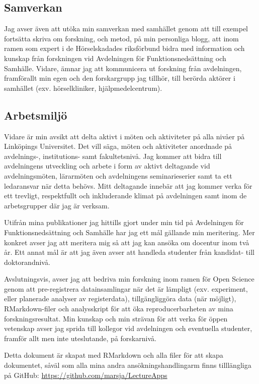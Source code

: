\documentclass[]{article}
\begin{document}
\hypertarget{samverkan}{%
\subsection{Samverkan}\label{samverkan}}

Jag avser även att utöka min samverkan med samhället genom att till
exempel fortsätta skriva om forskning, och metod, på min personliga
blogg, att inom ramen som expert i de Hörselskadades riksförbund bidra
med information och kunskap från forskningen vid Avdelningen för
Funktionsnedsättning och Samhälle. Vidare, ämnar jag att kommunicera ut
forskning från avdelningen, framförallt min egen och den forskargrupp
jag tillhör, till berörda aktörer i samhället (exv. hörselkliniker,
hjälpmedelcentrum).

\hypertarget{arbetsmiljuxf6}{%
\subsection{Arbetsmiljö}\label{arbetsmiljuxf6}}

Vidare är min avsikt att delta aktivt i möten och aktiviteter på alla
nivåer på Linköpings Universitet. Det vill säga, möten och aktiviteter
anordnade på avdelnings-, institutions- samt fakultetsnivå. Jag kommer
att bidra till avdelningens utveckling och arbete i form av aktivt
deltagande vid avdelningsmöten, lärarmöten och avdelningens
seminarieserier samt ta ett ledaransvar när detta behövs. Mitt
deltagande innebär att jag kommer verka för ett trevligt, respektfullt
och inkluderande klimat på avdelningen samt inom de arbetsgrupper där
jag är verksam.

\hfill\break
Utifrån mina publikationer jag hittills gjort under min tid på
Avdelningen för Funktionsnedsättning och Samhälle har jag ett mål
gällande min meritering. Mer konkret avser jag att meritera mig så att
jag kan ansöka om docentur inom två år. Ett annat mål är att jag även
avser att handleda studenter från kandidat- till doktorandnivå.

\hfill\break
Avslutningsvis, avser jag att bedriva min forskning inom ramen för Open
Science genom att pre-registrera datainsamlingar när det är lämpligt
(exv. experiment, eller planerade analyser av registerdata),
tillgängliggöra data (när möjligt), RMarkdown-filer och analysskript för
att öka reproducerbarheten av mina forskningsresultat. Min kunskap och
min strävan för att verka för öppen vetenskap avser jag sprida till
kollegor vid avdelningen och eventuella studenter, framför allt men inte
uteslutande, på forskarnivå.

\hfill\break
\footnotesize Detta dokument är skapat med RMarkdown och alla filer för
att skapa dokumentet, såväl som alla mina andra ansökningshandlingarm
finns tilllängliga på GitHub:
\url{https://github.com/marsja/LectureApps}
\end{document}
